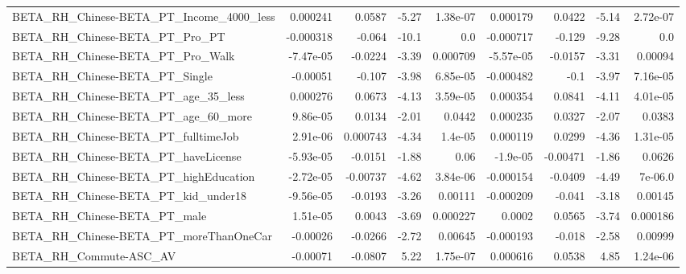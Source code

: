 \begin{tabular}{lrrrrrrrr}
BETA\_RH\_Chinese-BETA\_PT\_Income\_4000\_less           &    0.000241 &       0.0587 &     -5.27 & 1.38e-07 &   0.000179 &      0.0422 &        -5.14 &      2.72e-07 \\
BETA\_RH\_Chinese-BETA\_PT\_Pro\_PT                     &   -0.000318 &       -0.064 &     -10.1 &      0.0 &  -0.000717 &      -0.129 &        -9.28 &           0.0 \\
BETA\_RH\_Chinese-BETA\_PT\_Pro\_Walk                   &   -7.47e-05 &      -0.0224 &     -3.39 & 0.000709 &  -5.57e-05 &     -0.0157 &        -3.31 &       0.00094 \\
BETA\_RH\_Chinese-BETA\_PT\_Single                     &    -0.00051 &       -0.107 &     -3.98 & 6.85e-05 &  -0.000482 &        -0.1 &        -3.97 &      7.16e-05 \\
BETA\_RH\_Chinese-BETA\_PT\_age\_35\_less                &    0.000276 &       0.0673 &     -4.13 & 3.59e-05 &   0.000354 &      0.0841 &        -4.11 &      4.01e-05 \\
BETA\_RH\_Chinese-BETA\_PT\_age\_60\_more                &    9.86e-05 &       0.0134 &     -2.01 &   0.0442 &   0.000235 &      0.0327 &        -2.07 &        0.0383 \\
BETA\_RH\_Chinese-BETA\_PT\_fulltimeJob                &    2.91e-06 &     0.000743 &     -4.34 &  1.4e-05 &   0.000119 &      0.0299 &        -4.36 &      1.31e-05 \\
BETA\_RH\_Chinese-BETA\_PT\_haveLicense                &   -5.93e-05 &      -0.0151 &     -1.88 &     0.06 &   -1.9e-05 &    -0.00471 &        -1.86 &        0.0626 \\
BETA\_RH\_Chinese-BETA\_PT\_highEducation              &   -2.72e-05 &     -0.00737 &     -4.62 & 3.84e-06 &  -0.000154 &     -0.0409 &        -4.49 &       7e-06.0 \\
BETA\_RH\_Chinese-BETA\_PT\_kid\_under18                &   -9.56e-05 &      -0.0193 &     -3.26 &  0.00111 &  -0.000209 &      -0.041 &        -3.18 &       0.00145 \\
BETA\_RH\_Chinese-BETA\_PT\_male                       &    1.51e-05 &       0.0043 &     -3.69 & 0.000227 &     0.0002 &      0.0565 &        -3.74 &      0.000186 \\
BETA\_RH\_Chinese-BETA\_PT\_moreThanOneCar             &    -0.00026 &      -0.0266 &     -2.72 &  0.00645 &  -0.000193 &      -0.018 &        -2.58 &       0.00999 \\
BETA\_RH\_Commute-ASC\_AV                             &    -0.00071 &      -0.0807 &      5.22 & 1.75e-07 &   0.000616 &      0.0538 &         4.85 &      1.24e-06 \\

\end{tabular}
